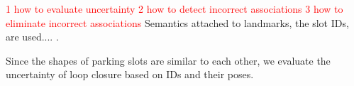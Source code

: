 \documentclass[journal]{IEEEtran}
\newcommand{\COMMENT}[1]{\textcolor{red}{#1}}
\begin{document}
\COMMENT{1 how to evaluate uncertainty}
\COMMENT{2 how to detect incorrect associations}
\COMMENT{3 how to eliminate incorrect associations}
Semantics attached to landmarks, the slot IDs, are used.... . 
%


Since the shapes of parking slots are similar to each other, we evaluate the uncertainty of loop closure based on IDs and their poses.
\end{document}
